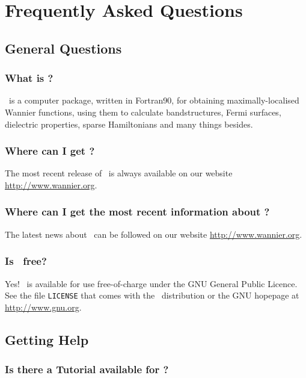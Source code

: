 \chapter{Frequently Asked Questions}\label{chap:faq}


\section{General Questions}

\subsection{What is \wannier?}

\wannier\ is a computer package, written in Fortran90, for obtaining
maximally-localised Wannier functions, using them to calculate
bandstructures, Fermi surfaces, dielectric properties, sparse
Hamiltonians and many things besides.

\subsection{Where can I get \wannier?}

The most recent release of \wannier\ is always available on our
website \url{http://www.wannier.org}.

\subsection{Where can I get the most recent information about
  \wannier?}

The latest news about \wannier\ can be followed on our website \url{http://www.wannier.org}.

\subsection{Is \wannier\ free?}

Yes! \wannier\ is available for use free-of-charge under the GNU
General Public Licence. See the file {\tt LICENSE} that comes with the
\wannier\ distribution or the GNU hopepage at \url{http://www.gnu.org}.

\section{Getting Help}

\subsection{Is there a Tutorial available for \wannier?}

